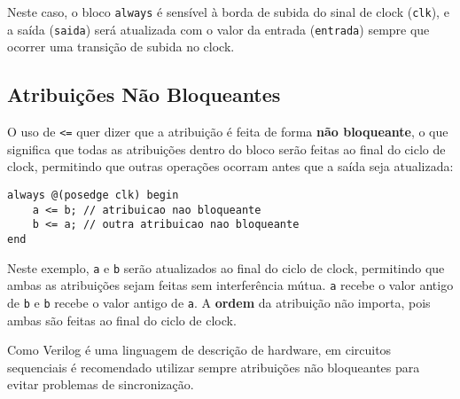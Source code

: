\documentclass{article}
\begin{document}
Neste caso, o bloco \texttt{always} é sensível à borda de subida do sinal de clock (\texttt{clk}), e a saída (\texttt{saida}) será atualizada com o valor da entrada (\texttt{entrada}) sempre que ocorrer uma transição de subida no clock.

\subsection*{Atribuições Não Bloqueantes}

O uso de \texttt{<=} quer dizer que a atribuição é feita de forma \textbf{não bloqueante}, o que significa que todas as atribuições dentro do bloco serão feitas ao final do ciclo de clock, permitindo que outras operações ocorram antes que a saída seja atualizada:

\begin{lstlisting}
always @(posedge clk) begin
    a <= b; // atribuicao nao bloqueante
    b <= a; // outra atribuicao nao bloqueante
end
\end{lstlisting}

Neste exemplo, \texttt{a} e \texttt{b} serão atualizados ao final do ciclo de clock, permitindo que ambas as atribuições sejam feitas sem interferência mútua. \texttt{a} recebe o valor antigo de \texttt{b} e \texttt{b} recebe o valor antigo de \texttt{a}. A \textbf{ordem} da atribuição não importa, pois ambas são feitas ao final do ciclo de clock.

Como Verilog é uma linguagem de descrição de hardware, em circuitos sequenciais é recomendado utilizar sempre atribuições não bloqueantes para evitar problemas de sincronização.
\end{document}
